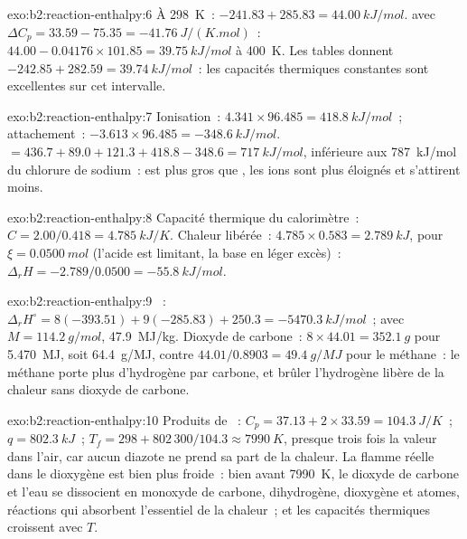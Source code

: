 \begin{solution}{exo:b2:reaction-enthalpy:6}
À \qty{298}{K}~: $-241.83 + 285.83 = \qty{44.00}{kJ/mol}$.  avec
$\Delta C_p = 33.59 - 75.35 = \qty{-41.76}{J/(K.mol)}$~:
$44.00 - 0.04176 \times 101.85 = \qty{39.75}{kJ/mol}$ à \qty{400}{K}. Les
tables donnent $-242.85 + 282.59 = \qty{39.74}{kJ/mol}$~: les capacités
thermiques constantes sont excellentes sur cet intervalle.
\end{solution}

\begin{solution}{exo:b2:reaction-enthalpy:7}
Ionisation~: $4.341 \times 96.485 = \qty{418.8}{kJ/mol}$~; attachement~:
$-3.613 \times 96.485 = \qty{-348.6}{kJ/mol}$.  $= 436.7 +
89.0 + 121.3 + 418.8 - 348.6 = \qty{717}{kJ/mol}$, inférieure aux
\qty{787}{kJ/mol} du chlorure de sodium~:  est plus gros que , les
ions sont plus éloignés et s'attirent moins.
\end{solution}

\begin{solution}{exo:b2:reaction-enthalpy:8}
Capacité thermique du calorimètre~: $C = 2.00/0.418 = \qty{4.785}{kJ/K}$.
Chaleur libérée~: $4.785 \times 0.583 = \qty{2.789}{kJ}$, pour $\xi =
\qty{0.0500}{mol}$ (l'acide est limitant, la base en léger excès)~:
$\Delta_r H = -2.789/0.0500 = \qty{-55.8}{kJ/mol}$.
\end{solution}

\begin{solution}{exo:b2:reaction-enthalpy:9}
~: $\Delta_r H^\circ =
8(-393.51) + 9(-285.83) + 250.3 = \qty{-5470.3}{kJ/mol}$~; avec $M =
\qty{114.2}{g/mol}$, \qty{47.9}{MJ/kg}. Dioxyde de carbone~: $8 \times 44.01 =
\qty{352.1}{g}$ pour \qty{5.470}{MJ}, soit \qty{64.4}{g/MJ}, contre
$44.01/0.8903 = \qty{49.4}{g/MJ}$ pour le méthane~: le méthane porte plus d'hydrogène par
carbone, et brûler l'hydrogène libère de la chaleur sans dioxyde de carbone.
\end{solution}

\begin{solution}{exo:b2:reaction-enthalpy:10}
Produits de ~: $C_p = 37.13 + 2 \times 33.59 =
\qty{104.3}{J/K}$~; $q = \qty{802.3}{kJ}$~; $T_f = 298 + 802\,300/104.3 \approx
\qty{7990}{K}$, presque trois fois la valeur dans l'air, car aucun diazote ne
prend sa part de la chaleur. La flamme réelle dans le dioxygène est bien plus froide~: bien avant \qty{7990}{K}, le dioxyde de carbone et l'eau
se dissocient en monoxyde de carbone, dihydrogène, dioxygène et atomes, réactions
 qui absorbent l'essentiel de la chaleur~; et les capacités thermiques croissent avec
$T$.
\end{solution}


